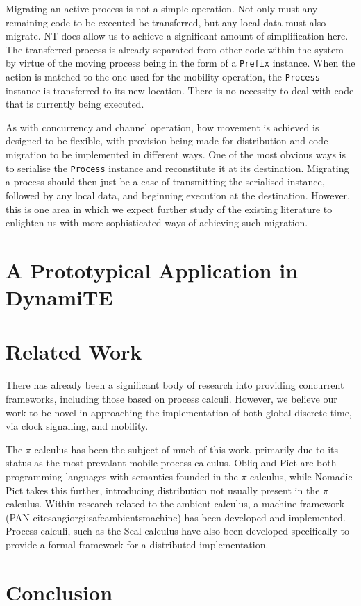 Migrating an active process is not a simple operation.  Not only must
any remaining code to be executed be transferred, but any local data
must also migrate.  NT does allow us to achieve a significant amount of
simplification here.  The transferred process is already separated from
other code within the system by virtue of the moving process being in
the form of a \texttt{Prefix} instance.  When the action is matched to
the one used for the mobility operation, the \texttt{Process} instance
is transferred to its new location.  There is no necessity to deal with
code that is currently being executed.

As with concurrency and channel operation, how movement is achieved is
designed to be flexible, with provision being made for distribution and
code migration to be implemented in different ways.  One of the most
obvious ways is to serialise the \texttt{Process} instance and
reconstitute it at its destination.  Migrating a process should then
just be a case of transmitting the serialised instance, followed by any
local data, and beginning execution at the destination.  However, this
is one area in which we expect further study of the existing literature
to enlighten us with more sophisticated ways of achieving such
migration.

\section{A Prototypical Application in DynamiTE}
\label{app:dynamite}
                                   
\section{Related Work}
\label{dyn:relatedwork}

There has already been a significant body of research into providing
concurrent frameworks, including those based on process calculi.
However, we believe our work to be novel in approaching the
implementation of both global discrete time, via clock signalling, and
mobility.

The $\pi$ calculus has been the subject of much of this work, primarily
due to its status as the most prevalant mobile process calculus.  Obliq
\cite{obliq} and Pict \cite{daveturner:phd} are both programming
languages with semantics founded in the $\pi$ calculus, while Nomadic
Pict \cite{wojciechowski:phd} takes this further, introducing
distribution not usually present in the $\pi$ calculus.  Within research
related to the ambient calculus, a machine framework (PAN
cite{sangiorgi:safeambientsmachine}) has been developed and
implemented.  Process calculi, such as the Seal calculus \cite{seal}
have also been developed specifically to provide a formal framework for
a distributed implementation.

\section{Conclusion}
